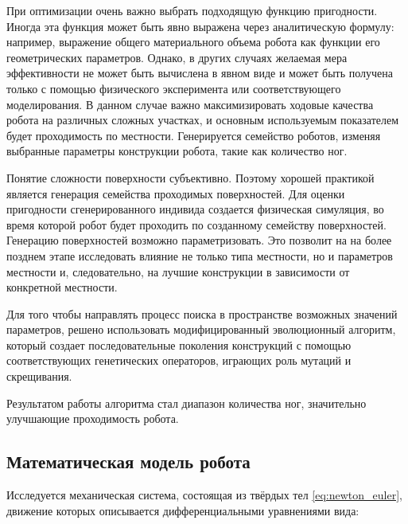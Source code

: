 При оптимизации очень важно выбрать подходящую функцию пригодности. Иногда эта функция может быть явно выражена через аналитическую формулу: например, выражение общего материального объема робота как функции его геометрических параметров. Однако, в других случаях желаемая мера эффективности не может быть вычислена в явном виде и может быть получена только с помощью физического эксперимента или соответствующего моделирования. В данном случае важно максимизировать ходовые качества робота на различных сложных участках, и основным используемым показателем будет проходимость по местности. Генерируется семейство роботов, изменяя выбранные параметры конструкции робота, такие как количество ног.

Понятие сложности поверхности субъективно. Поэтому хорошей практикой является генерация семейства проходимых поверхностей. Для оценки пригодности сгенерированного индивида создается физическая симуляция, во время которой робот будет проходить по созданному семейству поверхностей.  Генерацию поверхностей возможно параметризовать. Это позволит на на более позднем этапе исследовать влияние не только типа местности, но и параметров местности и, следовательно, на лучшие конструкции в зависимости от конкретной местности.

Для того чтобы направлять процесс поиска в пространстве возможных значений параметров, решено использовать модифицированный эволюционный алгоритм, который создает последовательные поколения конструкций с помощью соответствующих генетических операторов, играющих роль мутаций и скрещивания. 

Результатом работы алгоритма стал диапазон количества ног, значительно улучшающие проходимость робота.

\subsection{Математическая модель робота}
Исследуется механическая система, состоящая из твёрдых тел \eqref{eq:newton_euler}, движение которых описывается дифференциальными уравнениями вида:

